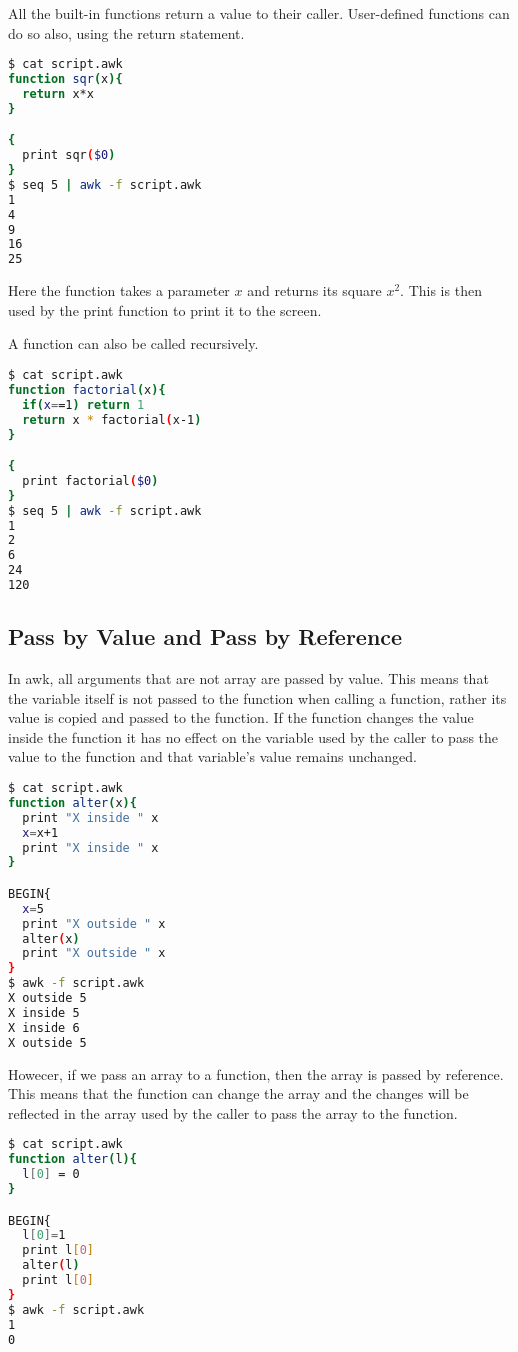 All the built-in functions return a value to their caller. User-defined functions can do so also, using the return statement.

\begin{lstlisting}[language=bash]
$ cat script.awk
function sqr(x){
  return x*x
}

{
  print sqr($0)
}
$ seq 5 | awk -f script.awk
1
4
9
16
25
\end{lstlisting}

Here the function takes a parameter $x$ and returns its square $x^2$. This is then used by the print function to print it to the screen.

A function can also be called recursively.

\begin{lstlisting}[language=bash]
$ cat script.awk
function factorial(x){
  if(x==1) return 1
  return x * factorial(x-1)
}

{
  print factorial($0)
}
$ seq 5 | awk -f script.awk
1
2
6
24
120
\end{lstlisting}

\subsection{Pass by Value and Pass by Reference}

In awk, all arguments that are not array are passed by value. This means that the variable itself is not passed to the function when calling a function, rather its value is copied and passed to the function. If the function changes the value inside the function it has no effect on the variable used by the caller to pass the value to the function and that variable's value remains unchanged.

\begin{lstlisting}[language=bash]
$ cat script.awk
function alter(x){
  print "X inside " x
  x=x+1
  print "X inside " x
}

BEGIN{
  x=5
  print "X outside " x
  alter(x)
  print "X outside " x
}
$ awk -f script.awk
X outside 5
X inside 5
X inside 6
X outside 5
\end{lstlisting}

Howecer, if we pass an array to a function, then the array is passed by reference. This means that the function can change the array and the changes will be reflected in the array used by the caller to pass the array to the function.

\begin{lstlisting}[language=bash]
$ cat script.awk
function alter(l){
  l[0] = 0
}

BEGIN{
  l[0]=1
  print l[0]
  alter(l)
  print l[0]
}
$ awk -f script.awk
1
0
\end{lstlisting}



